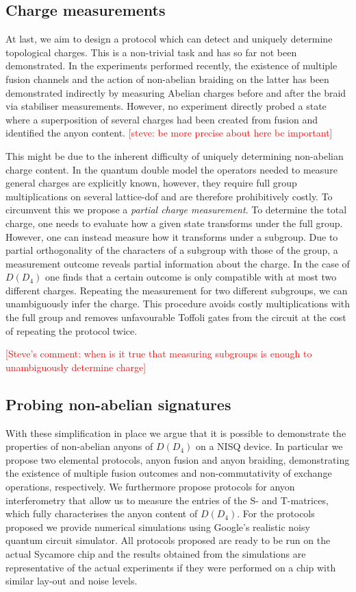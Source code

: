 \documentclass[two column]{article}
\newcommand{\caro}[1]{\textcolor{red}{[#1]}}
\begin{document}
\subsection{Charge measurements}
At last, we aim to design a protocol which can detect and uniquely determine topological charges. This is a non-trivial task and has so far not been demonstrated. In the experiments performed recently, the existence of multiple fusion channels and the action of non-abelian braiding on the latter has been demonstrated indirectly by measuring Abelian charges before and after the braid via stabiliser measurements. However, no experiment directly probed a state where a superposition of several charges had been created from fusion and identified the anyon content. 
\caro{steve: be more precise about here bc important}


This might be due to the inherent difficulty of uniquely determining non-abelian charge content. In the quantum double model the operators needed to measure general charges are explicitly known, however, they require full group multiplications on several lattice-dof and are therefore prohibitively costly. To circumvent this we propose a \emph{partial charge measurement}. To determine the total charge, one needs to evaluate how a given state transforms under the full group. However, one can instead measure how it transforms under a subgroup. Due to partial orthogonality of the characters of a subgroup with those of the group, a measurement outcome reveals partial information about the charge. In the case of $D(D_4)$ one finds that a certain outcome is only compatible with at most two different charges. Repeating the measurement for two different subgroups, we can unambiguously infer the charge. This procedure avoids costly multiplications with the full group and removes unfavourable Toffoli gates from the circuit at the cost of repeating the protocol twice.

\caro{Steve's comment: when is it true that measuring subgroups is enough to unambiguously determine charge}


\subsection{Probing non-abelian signatures}
With these simplification in place we argue that it is possible to demonstrate the properties of non-abelian anyons of $D(D_4)$ on a NISQ device. In particular we propose two elemental protocols, anyon fusion and anyon braiding, demonstrating the existence of multiple fusion outcomes and non-commutativity of exchange operations, respectively. We furthermore propose protocols for anyon interferometry that allow us to measure the entries of the S- and T-matrices, which fully characterises the anyon content of $D(D_4)$. For the protocols proposed we provide numerical simulations using Google's realistic noisy quantum circuit simulator. All protocols proposed are ready to be run on the actual Sycamore chip and the results obtained from the simulations are representative of the actual experiments if they were performed on a chip with similar lay-out and noise levels. 
\end{document}
